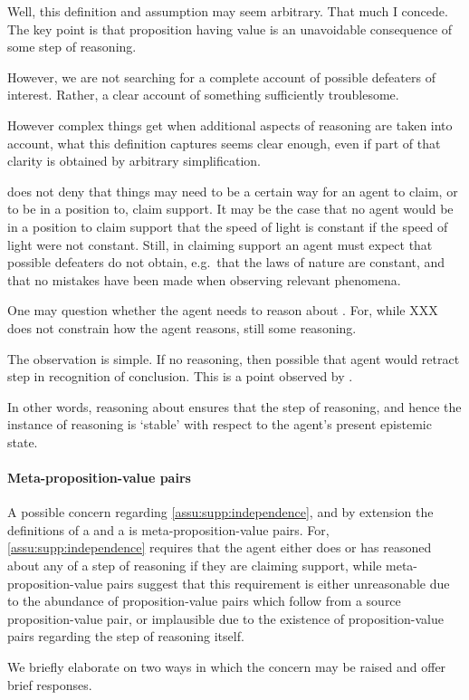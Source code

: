 \begin{note}
  Well, this definition and assumption may seem arbitrary.
  That much I concede.
  The key point is that proposition having value is an unavoidable consequence of some step of reasoning.

  However, we are not searching for a complete account of possible defeaters of interest.
  Rather, a clear account of something sufficiently troublesome.

  However complex things get when additional aspects of reasoning are taken into account, what this definition captures seems clear enough, even if part of that clarity is obtained by arbitrary simplification.
\end{note}

\begin{note}
  \eiS{} does not deny that things may need to be a certain way for an agent to claim, or to be in a position to, claim support.
  It may be the case that no agent would be in a position to claim support that the speed of light is constant if the speed of light were not constant.
  Still, in claiming support an agent must expect that possible defeaters do not obtain, e.g.\ that the laws of nature are constant, and that no mistakes have been made when observing relevant phenomena.
\end{note}

\begin{note}
  One may question whether the agent needs to reason about .
  For, while {\color{red} XXX} does not constrain how the agent reasons, still some reasoning.

  The observation is simple.
  If no reasoning, then possible that agent would retract step in recognition of conclusion.
  This is a point observed by \citeauthor{Harman:1973ww}.

  In other words, reasoning about \crequ{} ensures that the step of reasoning, and hence the instance of reasoning is `stable' with respect to the agent's present epistemic state.
\end{note}

\paragraph{Meta-proposition-value pairs}

\begin{note}
  A possible concern regarding \ref{assu:supp:independence}, and by extension the definitions of a \requ{} and a \result{} is meta-proposition-value pairs.
  For, \autoref{assu:supp:independence} requires that the agent either does or has reasoned about any  of a step of reasoning if they are claiming support, while meta-proposition-value pairs suggest that this requirement is either unreasonable due to the abundance of proposition-value pairs which follow from a source proposition-value pair, or implausible due to the existence of proposition-value pairs regarding the step of reasoning itself.

  We briefly elaborate on two ways in which the concern may be raised and offer brief responses.
\end{note}

